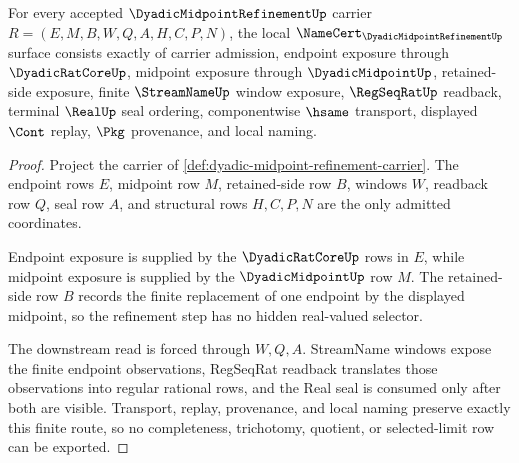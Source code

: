\begin{theorem}
\label{thm:dyadic-midpoint-refinement-namecert-obligations}
For every accepted $\DyadicMidpointRefinementUp$ carrier $R=(E,M,B,W,Q,A,H,C,P,N)$, the local $\NameCert_{\DyadicMidpointRefinementUp}$ surface consists exactly of carrier admission, endpoint exposure through $\DyadicRatCoreUp$, midpoint exposure through $\DyadicMidpointUp$, retained-side exposure, finite $\StreamNameUp$ window exposure, $\RegSeqRatUp$ readback, terminal $\RealUp$ seal ordering, componentwise $\hsame$ transport, displayed $\Cont$ replay, $\Pkg$ provenance, and local naming.
\end{theorem}
\begin{proof}
Project the carrier of \autoref{def:dyadic-midpoint-refinement-carrier}. The endpoint rows $E$, midpoint row $M$, retained-side row $B$, windows $W$, readback row $Q$, seal row $A$, and structural rows $H,C,P,N$ are the only admitted coordinates.

Endpoint exposure is supplied by the $\DyadicRatCoreUp$ rows in $E$, while midpoint exposure is supplied by the $\DyadicMidpointUp$ row $M$. The retained-side row $B$ records the finite replacement of one endpoint by the displayed midpoint, so the refinement step has no hidden real-valued selector.

The downstream read is forced through $W,Q,A$. StreamName windows expose the finite endpoint observations, RegSeqRat readback translates those observations into regular rational rows, and the Real seal is consumed only after both are visible. Transport, replay, provenance, and local naming preserve exactly this finite route, so no completeness, trichotomy, quotient, or selected-limit row can be exported.
\end{proof}

